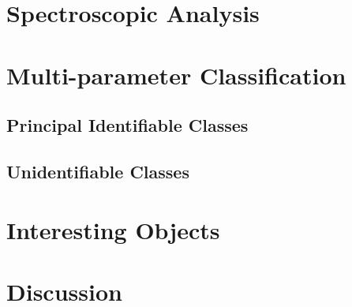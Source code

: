 \documentclass[twocolumn, tighten, astrosymb]{aastex631}
\begin{document}
\section{Spectroscopic Analysis} \label{spec}


\section{Multi-parameter Classification} \label{classes}


\subsection{Principal Identifiable Classes}


\subsection{Unidentifiable Classes}

\section{Interesting Objects} \label{weirdos}


\section{Discussion} \label{discussion}
\end{document}

